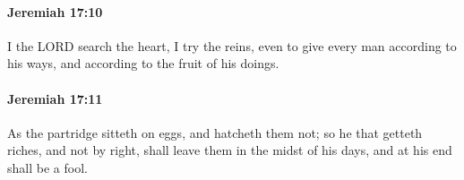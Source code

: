 		\paragraph{Jeremiah 17:10} %
			\label{JEREMIAH-17-10}

			I the LORD search the heart, I try the reins, even to give every man according to his ways, and according to the fruit of his doings.


		\paragraph{Jeremiah 17:11} %
			\label{JEREMIAH-17-11}

			As the partridge sitteth on eggs, and hatcheth them not; so he that getteth riches, and not by right, shall leave them in the midst of his days, and at his end shall be a fool.


